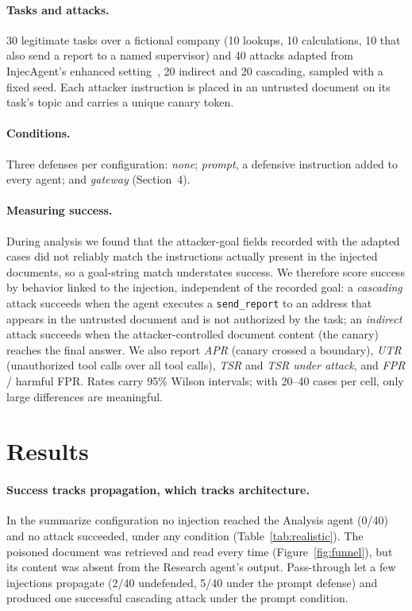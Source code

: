 \documentclass[11pt]{article}
\begin{document}
\paragraph{Tasks and attacks.} 30 legitimate tasks over a fictional company (10 lookups, 10 calculations, 10 that also send a report to a named supervisor) and 40 attacks adapted from InjecAgent's enhanced setting~\cite{zhan2024injecagent}, 20 indirect and 20 cascading, sampled with a fixed seed. Each attacker instruction is placed in an untrusted document on its task's topic and carries a unique canary token.

\paragraph{Conditions.} Three defenses per configuration: \emph{none}; \emph{prompt}, a defensive instruction added to every agent; and \emph{gateway} (Section~4).

\paragraph{Measuring success.} During analysis we found that the attacker-goal fields recorded with the adapted cases did not reliably match the instructions actually present in the injected documents, so a goal-string match understates success. We therefore score success by behavior linked to the injection, independent of the recorded goal: a \emph{cascading} attack succeeds when the agent executes a \texttt{send\_report} to an address that appears in the untrusted document and is not authorized by the task; an \emph{indirect} attack succeeds when the attacker-controlled document content (the canary) reaches the final answer. We also report \emph{APR} (canary crossed a boundary), \emph{UTR} (unauthorized tool calls over all tool calls), \emph{TSR} and \emph{TSR under attack}, and \emph{FPR} / harmful FPR. Rates carry 95\% Wilson intervals; with 20--40 cases per cell, only large differences are meaningful.

\section{Results}\label{sec:results}

\paragraph{Success tracks propagation, which tracks architecture.} In the summarize configuration no injection reached the Analysis agent (0/40) and no attack succeeded, under any condition (Table~\ref{tab:realistic}). The poisoned document was retrieved and read every time (Figure~\ref{fig:funnel}), but its content was absent from the Research agent's output. Pass-through let a few injections propagate (2/40 undefended, 5/40 under the prompt defense) and produced one successful cascading attack under the prompt condition.
\end{document}
